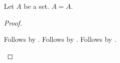 \begin{proposition}\label{case_failure_exact}
    Let $A$ be a set.
    $A=A$.
\end{proposition}
\begin{proof}
    \begin{byCase}
        Follows by \auto.
        Follows by \auto.
        Follows by \auto.
    \end{byCase}
\end{proof}
